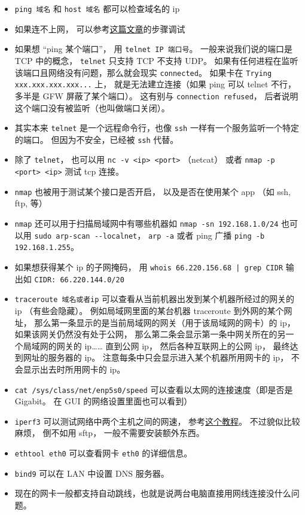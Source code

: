 \begin{itemize}
\item \verb`ping 域名` 和 \verb`host 域名` 都可以检查域名的 ip
\item 如果连不上网， 可以参考\href{https://upcloud.com/community/tutorials/troubleshoot-network-connectivity-linux-server/}{这篇文章}的步骤调试
\item 如果想 “ping 某个端口”， 用 \verb`telnet IP 端口号`。 一般来说我们说的端口是 TCP 中的概念， \verb`telnet` 只支持 TCP 不支持 UDP。 如果有任何进程在监听该端口且网络没有问题，那么就会现实 \verb`connected`。 如果卡在 \verb`Trying xxx.xxx.xxx.xxx...` 上， 就是无法建立连接（如果 ping 可以 telnet 不行， 多半是 GFW 屏蔽了某个端口）。 这有别与 \verb`connection refused`， 后者说明这个端口没有被监听（也叫做端口关闭）。
\item 其实本来 \verb`telnet` 是一个远程命令行，也像 \verb`ssh` 一样有一个服务监听一个特定的端口。 但因为不安全，已经被 \verb`ssh` 代替。
\item 除了 \verb`telnet`， 也可以用 \verb`nc -v <ip> <port>` （netcat） 或者 \verb`nmap -p <port> <ip>` 测试 tcp 连接。
\item \verb`nmap` 也被用于测试某个接口是否开启， 以及是否在使用某个 app （如 ssh, ftp, 等）
\item \verb`nmap` 还可以用于扫描局域网中有哪些机器如 \verb`nmap -sn 192.168.1.0/24` 也可以用 \verb`sudo arp-scan --localnet`， \verb`arp -a` 或者 ping 广播 \verb`ping -b 192.168.1.255`。
\item 如果想获得某个 ip 的子网掩码， 用 \verb`whois 66.220.156.68 | grep CIDR` 输出如 \verb`CIDR: 66.220.144.0/20`
\item \verb`traceroute 域名或者ip` 可以查看从当前机器出发到某个机器所经过的网关的 ip （有些会隐藏）。 例如局域网里面的某台机器 traceroute 到外网的某个网址， 那么第一条显示的是当前局域网的网关（用于该局域网的网卡）的 ip， 如果该网关仍然没有处于公网， 那么第二条会显示第一条中网关所在的另一个局域网的网关的 ip…… 直到公网 ip， 然后各种互联网上的公网 ip， 最终达到网址的服务器的 ip。 注意每条中只会显示进入某个机器所用网卡的 ip， 不会显示出去时所用网卡的 ip。
\item \verb`cat /sys/class/net/enp5s0/speed` 可以查看以太网的连接速度（即是否是 Gigabit。 在 GUI 的网络设置里面也可以看到）
\item \verb`iperf3` 可以测试网络中两个主机之间的网速， 参考\href{https://www.cyberciti.biz/faq/how-to-test-the-network-speedthroughput-between-two-linux-servers/}{这个教程}。 不过貌似比较麻烦， 倒不如用 sftp， 一般不需要安装额外东西。
\item \verb`ethtool eth0` 可以查看网卡 \verb`eth0` 的详细信息。
\item \verb`bind9` 可以在 LAN 中设置 DNS 服务器。
\item 现在的网卡一般都支持自动跳线，也就是说两台电脑直接用网线连接没什么问题。
\end{itemize}

